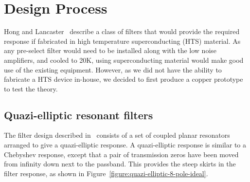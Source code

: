 
\section{Design Process}
Hong and Lancaster~\cite{hong:microstrip} describe a class of filters that would provide the required response if fabricated in high temperature superconducting (HTS) material. As any pre-select filter would need to be installed along with the low noise amplifiers, and cooled to 20K, using superconducting material would make good use of the existing equipment. However, as we did not have the ability to fabricate a HTS device in-house, we decided to first produce a copper prototype to test the theory.

\subsection{Quazi-elliptic resonant filters}
The filter design described in~\cite{hong:microstrip} consists of a set of coupled planar resonators arranged to give a quazi-elliptic response. A quazi-elliptic response is similar to a Chebyshev response, except that a pair of transmission zeros have been moved from infinity down next to the passband. This provides the steep skirts in the filter response, as shown in Figure~\ref{figure:quazi-elliptic-8-pole-ideal}.

